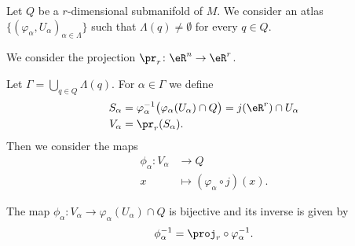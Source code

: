 Let \( Q\) be a \( r\)-dimensional submanifold of \( M\). We consider an atlas \( \{ (\varphi_{\alpha},U_{\alpha})_{\alpha\in \Lambda} \}\) such that \( \Lambda(q)\neq \emptyset\) for every \( q\in Q\).

We consider the projection \(\pr_r \colon \eR^n\to \eR^r  \).

Let \( \Gamma=\bigcup_{q\in Q}\Lambda(q)\). For \( \alpha\in \Gamma\) we define
\begin{subequations}
	\begin{align}
		S_{\alpha} & =\varphi_{\alpha}^{-1}\big( \varphi_{\alpha}(U_{\alpha})\cap Q \big) =j(\eR^r)\cap U_{\alpha} \\
		V_{\alpha} & =\pr_r(S_{\alpha}).
	\end{align}
\end{subequations}
Then we consider the maps
\begin{equation}		\label{EQooMXNPooLAKIqk}
	\begin{aligned}
		\phi_{\alpha}\colon V_{\alpha} & \to Q                                 \\
		x                              & \mapsto (\varphi_{\alpha}\circ j)(x).
	\end{aligned}
\end{equation}

\begin{lemma}	\label{LEMooUYHPooLPfNVr}
	The map \(\phi_{\alpha} \colon V_{\alpha}\to \varphi_{\alpha}(U_{\alpha})\cap Q  \) is bijective and its inverse is given by
	\begin{equation}
		\phi_{\alpha}^{-1}=\proj_r\circ\varphi_{\alpha}^{-1}.
	\end{equation}
\end{lemma}

